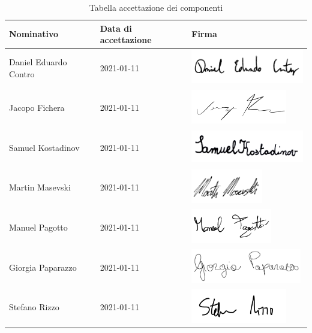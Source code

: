 \documentclass[../piano_di_progetto.tex]{subfiles}
\begin{document}
\begin{table}[!ht]
	\centering
	\begin{tabular}{|l|l|l|}
		\hline
		\rowcolor{lightgray}
		\textbf{Nominativo} & \textbf{Data di accettazione} & \textbf{Firma} \\ 
		\hline
		Daniel Eduardo Contro & 2021-01-11 & \includegraphics[height=1.5cm]{componenti/img/firma_dec.png} \\ 
		\hline
		Jacopo Fichera & 2021-01-11 & \includegraphics[height=1.5cm]{componenti/img/firma_jf.png} \\ 
		\hline
		Samuel Kostadinov & 2021-01-11 & \includegraphics[height=1.5cm]{componenti/img/firma_sk.png} \\
		\hline
		Martin Masevski & 2021-01-11 & \includegraphics[height=1.5cm]{componenti/img/firma_mm.png} \\ 
		\hline
		Manuel Pagotto & 2021-01-11 & \includegraphics[height=1.5cm]{componenti/img/firma_mp.png}  \\ 
		\hline
		Giorgia Paparazzo & 2021-01-11 & \includegraphics[height=1.5cm]{componenti/img/firma_gp.png} \\
		\hline
		Stefano Rizzo & 2021-01-11 & \includegraphics[height=1.5cm]{componenti/img/firma_sr.png}  \\ 
		\hline

	\end{tabular}
		\caption{Tabella accettazione dei componenti}
\end{table}
\end{document}
